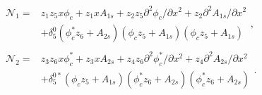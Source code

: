 \begin{align}
 	\begin{split}
 		\mathcal{N}_{1} =&
			z_{1}z_{5}x\phi_{c} + z_{1}xA_{1s} + z_{2}z_{5}\partial^{2}\phi_{c}/\partial x^{2} + z_{2}\partial^{2}A_{1s}/\partial x^{2} \\
			 &+ \delta^{0}_{5}(\phi^{*}_{c}z_{6} +  A_{2s}) (\phi_{c}z_{5} +  A_{1s})(\phi_{c}z_{5} +  A_{1s})
	\end{split}, \nonumber \\
	\begin{split}
		\mathcal{N}_{2} =&
		z_{3}z_{6}x\phi^{*}_{c} + z_{3}xA_{2s} + z_{4}z_{6}\partial^{2}\phi^{*}_{c}/\partial x^{2} + z_{4}\partial^{2}A_{2s}/\partial x^{2} \\
		&+ \delta^{0*}_{5}(\phi_{c}z_{5} +  A_{1s}) (\phi^{*}_{c}z_{6} +  A_{2s})(\phi^{*}_{c}z_{6} +  A_{2s})
	\end{split}. \nonumber
\end{align}

